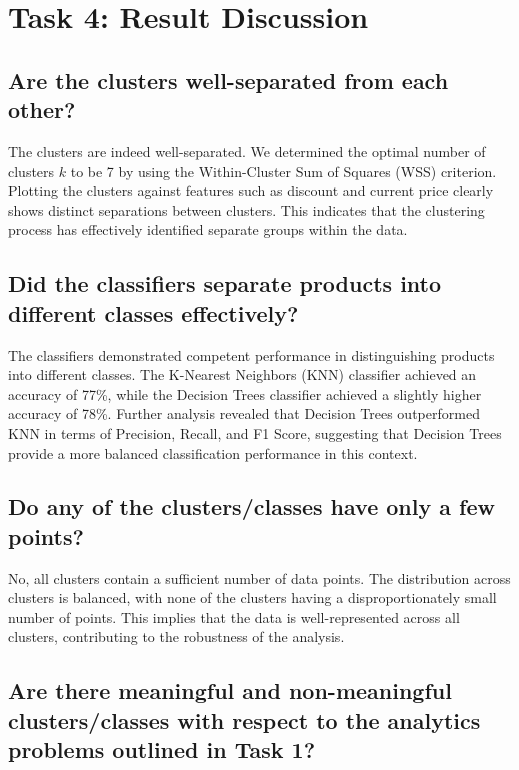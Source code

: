\documentclass[a4paper,11pt]{article}
\begin{document}
\section{Task 4: Result Discussion}
\label{sec:result}

\subsection{Are the clusters well-separated from each other?}

\noindent
The clusters are indeed well-separated. We determined the optimal number of clusters \( k \) to be 7 by using the Within-Cluster Sum of Squares (WSS) criterion. Plotting the clusters against features such as discount and current price clearly shows distinct separations between clusters. This indicates that the clustering process has effectively identified separate groups within the data.

\subsection{ Did the classifiers separate products into different classes effectively?}

\noindent
The classifiers demonstrated competent performance in distinguishing products into different classes. The K-Nearest Neighbors (KNN) classifier achieved an accuracy of 77\%, while the Decision Trees classifier achieved a slightly higher accuracy of 78\%. Further analysis revealed that Decision Trees outperformed KNN in terms of Precision, Recall, and F1 Score, suggesting that Decision Trees provide a more balanced classification performance in this context.

\subsection{Do any of the clusters/classes have only a few points?}

\noindent
No, all clusters contain a sufficient number of data points. The distribution across clusters is balanced, with none of the clusters having a disproportionately small number of points. This implies that the data is well-represented across all clusters, contributing to the robustness of the analysis.

\subsection{Are there meaningful and non-meaningful clusters/classes with respect to the analytics problems outlined in Task 1?}
\end{document}
